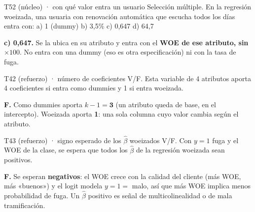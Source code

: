 \documentclass[10pt,a4paper]{article}
\begin{document}
\begin{enun}{T52 (núcleo) · con qué valor entra un usuario}
Selección múltiple. En la regresión woeizada, una usuaria con renovación automática que escucha todos los días entra con: a) 1 (dummy) \quad b) 3,5\% \quad c) 0,647 \quad d) 64,7
\end{enun}
\begin{ejemplar}
\textbf{c) 0,647.} Se la ubica en su atributo y entra con el \textbf{WOE de ese atributo, sin $\times100$}. No entra con una dummy (eso es otra especificación) ni con la tasa de fuga.
\end{ejemplar}

\begin{enun}{T42 (refuerzo) · número de coeficientes}
V/F. Esta variable de 4 atributos aporta 4 coeficientes si entra como dummies y 1 si entra woeizada.
\end{enun}
\begin{ejemplar}
\textbf{F.} Como dummies aporta $k-1=\mathbf{3}$ (un atributo queda de base, en el intercepto). Woeizada aporta \textbf{1}: una sola columna cuyo valor cambia según el atributo.
\end{ejemplar}

\begin{enun}{T43 (refuerzo) · signo esperado de los $\hat\beta$ woeizados}
V/F. Con $y=1$ fuga y el WOE de la clase, se espera que todos los $\hat\beta$ de la regresión woeizada sean positivos.
\end{enun}
\begin{ejemplar}
\textbf{F.} Se esperan \textbf{negativos}: el WOE crece con la calidad del cliente (más WOE, más «buenos») y el logit modela $y=1=$ malo, así que más WOE implica menos probabilidad de fuga. Un $\hat\beta$ positivo es señal de multicolinealidad o de mala tramificación.
\end{ejemplar}
\end{document}
